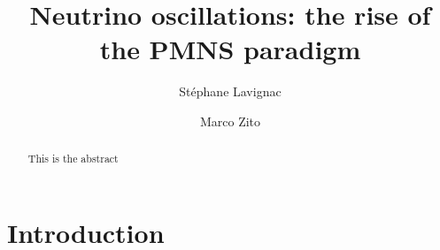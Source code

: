 \documentclass[preprint,12pt]{elsarticle}
\begin{document}
\begin{frontmatter}



\title{Neutrino oscillations: the rise of the PMNS paradigm}


\author{St\'ephane Lavignac}

\address{IPhT, CEA Saclay, 91191 Gif-sur-Yvette CEDEX, France}

\author{Marco Zito}

\address{IRFU/SPP, CEA Saclay, 91191 Gif-sur-Yvette CEDEX, France}

\begin{abstract}
This is the abstract
\end{abstract}

\begin{keyword}



\end{keyword}

\end{frontmatter}


\section{Introduction}
\label{sec:intro}
\end{document}

